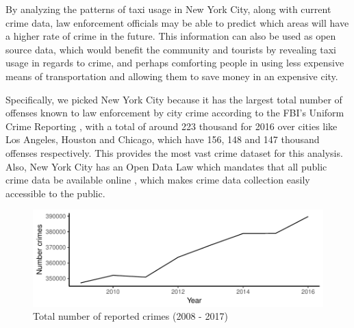 \documentclass{sigkddExp}
\begin{document}
By analyzing the patterns of taxi usage in New York City, along with current crime data, law enforcement officials may be able to predict which areas will have a higher rate of crime in the future. This information can also be used as open source data, which would benefit the community and tourists by revealing taxi usage in regards to crime, and perhaps comforting people in using less expensive means of transportation and allowing them to save money in an expensive city.  


Specifically, we picked New York City because it has the largest  total number of offenses known to law enforcement by city crime according to the FBI's Uniform Crime Reporting \cite{fbiUniformCrime}, with a total of around 223 thousand for 2016 over cities like Los Angeles, Houston and Chicago, which have 156, 148 and
147 thousand offenses respectively. 
This provides the most vast crime dataset for this analysis.
Also, New York City has an Open Data Law which mandates that all public crime data be available online \cite{OpenDat}, which makes crime data collection easily accessible to the public.

\begin{figure}
\caption{Total number of reported crimes (2008 - 2017)}
\label{total_crimes}
\centering \includegraphics[width=.45\textwidth]{../img/total_crimes.pdf}
\end{figure}





\end{document}
